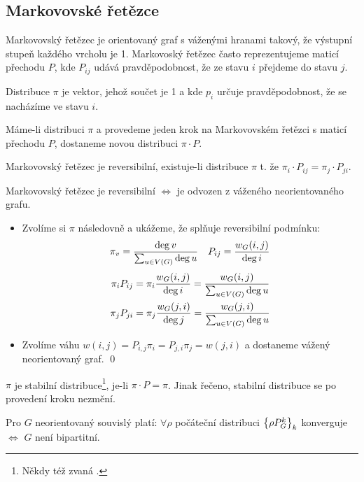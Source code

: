 \subsection{Markovovské řetězce}


\df Markovovský řetězec je orientovaný graf s váženými hranami takový, že
výstupní stupeň každého vrcholu je 1. Markovoský řetězec často reprezentujeme
maticí přechodu $P$, kde $P_{ij}$ udává pravděpodobnost, že ze stavu $i$
přejdeme do stavu $j$.

\df Distribuce $\pi$ je vektor, jehož součet je 1 a kde $p_i$ určuje
pravděpodobnost, že se nacházíme ve stavu $i$.

\pzn Máme-li distribuci $\pi$ a provedeme jeden krok na Markovovském řetězci s
maticí přechodu $P$, dostaneme novou distribuci $\pi\cdot P$.

\df Markovovský řetězec je reversibilní, existuje-li distribuce $\pi$
t. že $\pi_i\cdot P_{ij} = \pi_j\cdot P_{ji}$.

\lm Markovovský řetězec je reversibilní $\Leftrightarrow$ je odvozen z váženého neorientovaného grafu.

\dk 
\begin{itemize}

\item[\uv{$\Leftarrow$}]
Zvolíme si $\pi$ následovně a ukážeme, že splňuje reversibilní podmínku:
\begin{align*}
& \pi_v = {\deg v\over \sum_{u\in V(G)} \deg u} & P_{ij} = {w_G(i,j)\over \deg i} \\ 
\end{align*}
\begin{align*}
\pi_i P_{ij} &= \pi_i {w_G(i,j)\over \deg i} = {w_G(i,j)\over \sum_{u\in V(G)}\deg u} \\
\pi_j P_{ji} &= \pi_j {w_G(j,i)\over \deg j} = {w_G(j,i)\over \sum_{u\in V(G)}\deg u}
\end{align*}

\item[\uv{$\Rightarrow$}]
Zvolíme váhu $w(i,j) = P_{i,j}\pi_i = P_{j,i}\pi_j = w(j,i)$ a dostaneme vážený
neorientovaný graf.
\qed
\end{itemize}

\df $\pi$ je stabilní distribuce\footnote{Někdy též zvaná .},
je-li $\pi\cdot P = \pi$. Jinak řečeno, stabilní distribuce se po provedení
kroku nezmění.

\vt Pro $G$ neorientovaný souvislý platí: $\forall \rho$ počáteční distribuci
$\left\{ \rho P_G^k \right\}_k$ konverguje $\Leftrightarrow$ $G$ není bipartitní.

